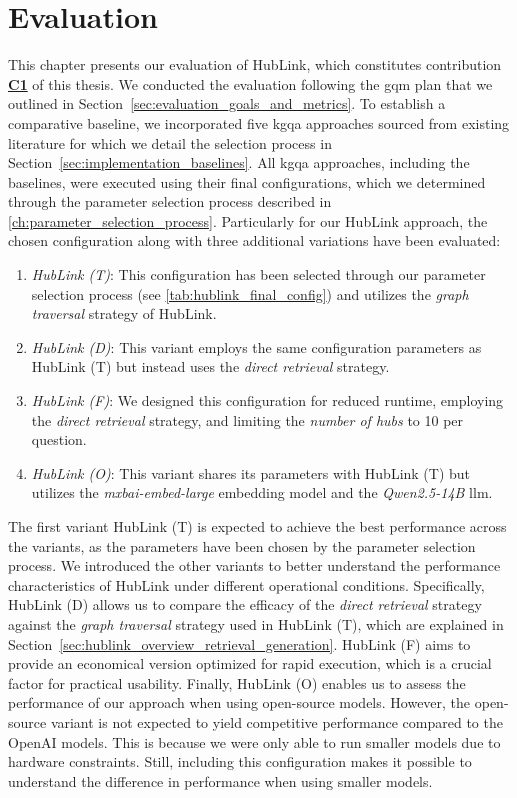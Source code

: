 
\chapter{Evaluation}
\label{ch:experimentation}

This chapter presents our evaluation of HubLink, which constitutes contribution \hyperref[enum:c1]{\textbf{C1}} of this thesis. We conducted the evaluation following the \gls{gqm} plan that we outlined in Section~\ref{sec:evaluation_goals_and_metrics}. To establish a comparative baseline, we incorporated five \gls{kgqa} approaches sourced from existing literature for which we detail the selection process in Section~\ref{sec:implementation_baselines}. All \gls{kgqa} approaches, including the baselines, were executed using their final configurations, which we determined through the parameter selection process described in \autoref{ch:parameter_selection_process}. Particularly for our HubLink approach, the chosen configuration along with three additional variations have been evaluated:

\begin{enumerate}
    \item \emph{HubLink (T)}: This configuration has been selected through our parameter selection process (see \autoref{tab:hublink_final_config}) and utilizes the \emph{graph traversal} strategy of HubLink.
    \item \emph{HubLink (D)}: This variant employs the same configuration parameters as HubLink (T) but instead uses the \emph{direct retrieval} strategy.
    \item \emph{HubLink (F)}: We designed this configuration for reduced runtime, employing the \emph{direct retrieval} strategy, and limiting the \emph{number of hubs} to 10 per question.
    \item \emph{HubLink (O)}: This variant shares its parameters with HubLink (T) but utilizes the \emph{mxbai-embed-large} embedding model and the \emph{Qwen2.5-14B} \gls{llm}.
\end{enumerate}

The first variant HubLink (T) is expected to achieve the best performance across the variants, as the parameters have been chosen by the parameter selection process. We introduced the other variants to better understand the performance characteristics of HubLink under different operational conditions. Specifically, HubLink (D) allows us to compare the efficacy of the \emph{direct retrieval} strategy against the \emph{graph traversal} strategy used in HubLink (T), which are explained in Section~\ref{sec:hublink_overview_retrieval_generation}. HubLink (F) aims to provide an economical version optimized for rapid execution, which is a crucial factor for practical usability. Finally, HubLink (O) enables us to assess the performance of our approach when using open-source models. However, the open-source variant is not expected to yield competitive performance compared to the OpenAI models. This is because we were only able to run smaller models due to hardware constraints. Still, including this configuration makes it possible to understand the difference in performance when using smaller models.

